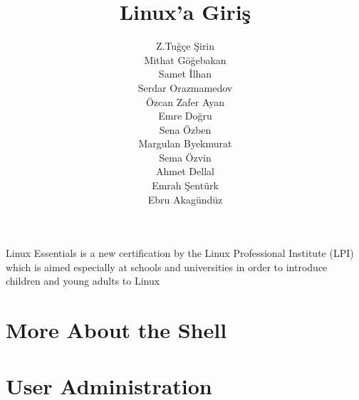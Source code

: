 \documentclass[10pt,a5paper]{book}
\begin{document}
\title{Linux'a Giriş}
\author{Z.Tuğçe Şirin\\
Mithat Göğebakan\\
Samet İlhan\\
Serdar Orazmamedov\\
Özcan Zafer Ayan\\
Emre Doğru\\
Sena Özben\\
Margulan Byekmurat\\
Sema Özvin\\
Ahmet Dellal\\
Emrah Şentürk\\
Ebru Akagündüz}
\renewcommand{\today}{December 13, 2012}
\renewcommand*\chaptername{Bölüm}
\maketitle
Linux Essentials is a new certification by the Linux Professional Institute (LPI) which is aimed especially at schools and universities in order to introduce children and young adults to Linux
\renewcommand*\contentsname{İçindekiler}
\tableofcontents
\listoftables








\chapter{More About the Shell}



\chapter{User Administration}


\end{document}
